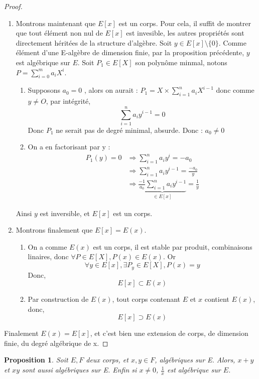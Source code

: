 \documentclass[a4paper,12pt,french]{report}
\newtheorem{proposition}{Proposition}[section]
\begin{document}
\begin{proof}
\begin{enumerate}
		\item Montrons maintenant que $E[x]$ est un corps. Pour cela, il suffit de montrer que tout élément non nul de  $E[x]$ est invesible, les autres propriétés sont directement héritées de la structure d'algèbre.
			Soit $y \in E[x]\setminus\{0\} $. Comme élément d'une E-algèbre de dimension finie, par la proposition précédente, $y$ est algébrique sur $E$. Soit \(P_{1} \in E[X]\) son polynôme minmal, notons \(P = \sum_{i=0}^{m}a_{i}X^{i}\).{}
			\begin{enumerate}
				\item Supposons $a_{0} = 0$ , alors on aurait : $P_{1} = X\times\sum_{i=1}^{n}a_{i}X^{i-1}$ donc comme $y \neq O$, par intégrité,
				\[{}
					\sum_{i=1}^{n}a_{i}y^{i-1} = 0
				\]
				Donc $P_{1}$ ne serait pas de degré minimal, absurde. Donc : $a_{0} \neq 0 $
			
				\item On a en factorisant par y :
				\[{}
					\begin{aligned}
						P_{1}(y) = 0 &\Rightarrow \sum_{i=1}^{n}a_{i}y^{i} = -a_{0}\\
									&\Rightarrow \sum_{i=1}^{n}a_{i}y^{i-1} = \frac{-a_{0}}{y}\\
									&\Rightarrow \underbrace{\frac{-1}{a_{0}}\sum_{i=1}^{n}a_{i}y^{i-1}}_{\in E[x]} = \frac{1}{y}
					\end{aligned}
				\]
			\end{enumerate}
			Ainsi $y$ est inversible, et $E[x]$ est un corps.
			
		\item Montrons finalement que $E[x] = E(x)$. 
			\begin{enumerate}
				\item On a comme $E(x)$ est un corps, il est stable par produit, combinaisons linaires, donc \(\forall P \in E[X], P(x) \in E(x)\). Or \[ \forall y \in E[x], \exists P_{y} \in E[X], P(x) = y \] Donc,  \[E[x] \subset E(x)\]
				\item 
				Par construction de $E(x)$, tout corps contenant $E$ et $x$ contient \(E(x)\), donc, 
				\[ E[x] \supset E(x) \]
			\end{enumerate}
	\end{enumerate}
	Finalement \(E(x) = E[x]\), et c'est bien une extension de corps, de dimension finie, du degré algébrique de x.
				\end{proof}
				
		
		\begin{proposition}
			Soit $E,F$ deux corps, et $x,y \in F$, algébriques sur E. Alors, 
			$x+y$ et $xy$ sont aussi algébriques sur E. Enfin si $x\neq0$, $\frac{1}{x}$ est algébrique sur $E$. 
		\end{proposition}
		
\end{document}
